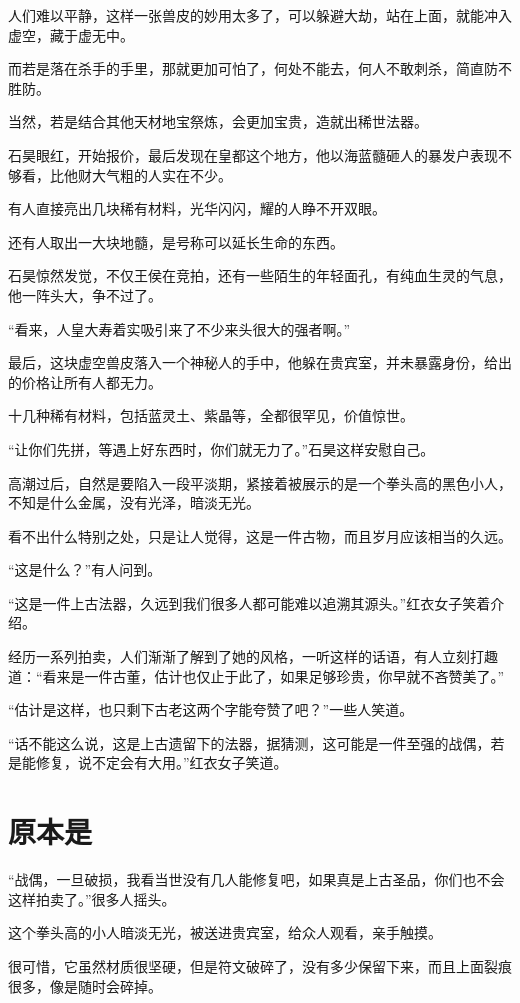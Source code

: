 人们难以平静，这样一张兽皮的妙用太多了，可以躲避大劫，站在上面，就能冲入虚空，藏于虚无中。

而若是落在杀手的手里，那就更加可怕了，何处不能去，何人不敢刺杀，简直防不胜防。

当然，若是结合其他天材地宝祭炼，会更加宝贵，造就出稀世法器。

石昊眼红，开始报价，最后发现在皇都这个地方，他以海蓝髓砸人的暴发户表现不够看，比他财大气粗的人实在不少。

有人直接亮出几块稀有材料，光华闪闪，耀的人睁不开双眼。

还有人取出一大块地髓，是号称可以延长生命的东西。

石昊惊然发觉，不仅王侯在竞拍，还有一些陌生的年轻面孔，有纯血生灵的气息，他一阵头大，争不过了。

“看来，人皇大寿着实吸引来了不少来头很大的强者啊。”

最后，这块虚空兽皮落入一个神秘人的手中，他躲在贵宾室，并未暴露身份，给出的价格让所有人都无力。

十几种稀有材料，包括蓝灵土、紫晶等，全都很罕见，价值惊世。

“让你们先拼，等遇上好东西时，你们就无力了。”石昊这样安慰自己。

高潮过后，自然是要陷入一段平淡期，紧接着被展示的是一个拳头高的黑色小人，不知是什么金属，没有光泽，暗淡无光。

看不出什么特别之处，只是让人觉得，这是一件古物，而且岁月应该相当的久远。

“这是什么？”有人问到。

“这是一件上古法器，久远到我们很多人都可能难以追溯其源头。”红衣女子笑着介绍。

经历一系列拍卖，人们渐渐了解到了她的风格，一听这样的话语，有人立刻打趣道：“看来是一件古董，估计也仅止于此了，如果足够珍贵，你早就不吝赞美了。”

“估计是这样，也只剩下古老这两个字能夸赞了吧？”一些人笑道。

“话不能这么说，这是上古遗留下的法器，据猜测，这可能是一件至强的战偶，若是能修复，说不定会有大用。”红衣女子笑道。

\section{原本是}

“战偶，一旦破损，我看当世没有几人能修复吧，如果真是上古圣品，你们也不会这样拍卖了。”很多人摇头。

这个拳头高的小人暗淡无光，被送进贵宾室，给众人观看，亲手触摸。

很可惜，它虽然材质很坚硬，但是符文破碎了，没有多少保留下来，而且上面裂痕很多，像是随时会碎掉。

